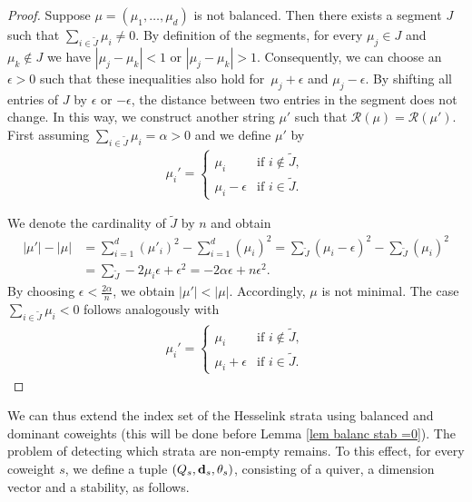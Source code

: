 \documentclass[pdftex]{sigma}
\newcommand{\R}{\mathcal{R}}
\numberwithin{equation}{section}
\theoremstyle{definition}
\begin{document}
\begin{proof}
Suppose $\mu = (\mu_1, \dots, \mu_d)$ is not balanced. Then there exists a segment $J$ such that $\sum_{i \in \tilde{J}} \mu_i \neq 0$. By definition of the segments, for every $\mu_j \in J$ and $\mu_k \notin J$ we have $|\mu_j - \mu_k| < 1$ or $|\mu_j - \mu_k| > 1$. Consequently, we can choose an $ \epsilon >0$ such that these inequalities also hold for~${\mu_j + \epsilon}$ and $\mu_j - \epsilon$. By shifting all entries of $J$ by $\epsilon$ or $-\epsilon$, the distance between two entries in the segment does not change. In this way, we construct another string $\mu'$ such that $\R(\mu) = \R(\mu')$. First assuming $\sum_{i \in \tilde{J}} \mu_i = \alpha > 0$ and we define $\mu'$ by
\begin{gather*}
 \mu_i' = \begin{cases}
 \mu_i & \text{if } i \notin \tilde{J} ,\\
 \mu_i - \epsilon & \text{if } i \in \tilde{J} .
 \end{cases}
\end{gather*}

We denote the cardinality of $\tilde{J}$ by $n$ and obtain
\begin{align*}
|\mu'|- |\mu|&= \sum_{i=1}^d (\mu'_i)^2 - \sum_{i=1}^d (\mu_i)^2 = \sum_{\tilde{J}} (\mu_i - \epsilon)^2 - \sum_{\tilde{J}} (\mu_i)^2 \\
&= \sum_{\tilde{J}} -2\mu_i\epsilon +\epsilon^2 = -2\alpha\epsilon + n \epsilon^2 .
\end{align*}
By choosing $\epsilon < \frac{2\alpha}{n}$, we obtain $|\mu'| < |\mu|$. Accordingly, $\mu$ is not minimal. The case $\sum_{i \in \tilde{J}} \mu_i < 0$ follows analogously with
\begin{gather*}
 \mu_i' = \begin{cases}
 \mu_i & \text{if } i \notin \tilde{J}, \\
 \mu_i + \epsilon & \text{if } i \in \tilde{J} .
 \end{cases}\tag*{\qed}
\end{gather*}\renewcommand{\qed}{}
\end{proof}

We can thus extend the index set of the Hesselink strata using balanced and dominant coweights (this will be done before Lemma \ref{lem balanc stab =0}). The problem of detecting which strata are non-empty remains. To this effect, for every coweight $s$, we define a tuple $(Q_s,{\bf d}_s,\theta_s)$, consisting of a quiver, a dimension vector and a stability, as follows.
\end{document}
